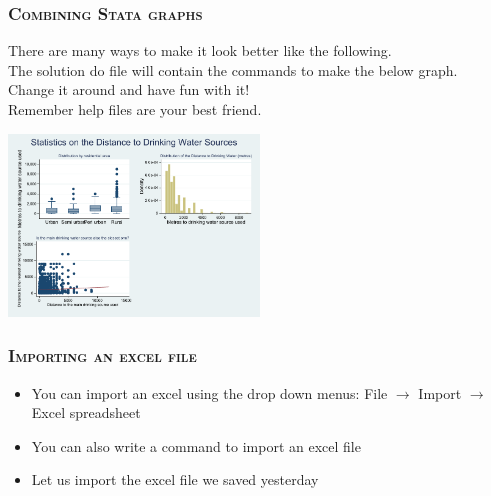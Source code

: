 \documentclass[10pt]{beamer}
\begin{document}
	\begin{frame}
	\frametitle{\textsc{Combining Stata graphs}}
		There are many ways to make it look better like the following. \\
		The solution do file will contain the commands to make the below graph. \\
		Change it around and have fun with it! \\
		Remember help files are your best friend.
	
\begin{center}
    \includegraphics[width=0.5\textwidth]{combined_better.pdf}
\end{center}
	\end{frame}
	
	\begin{frame}
		\frametitle{\textsc{Importing an excel file}}
		\begin{itemize}
		\item You can import an excel using the drop down menus:
		File $\rightarrow$ Import $\rightarrow$ Excel spreadsheet
		\item You can also write a command to import an excel file
		\item Let us import the excel file we saved yesterday
		\end{itemize}
		
\begin{stlog}\end{stlog}
		
		
		
	\end{frame}
	
\end{document}
